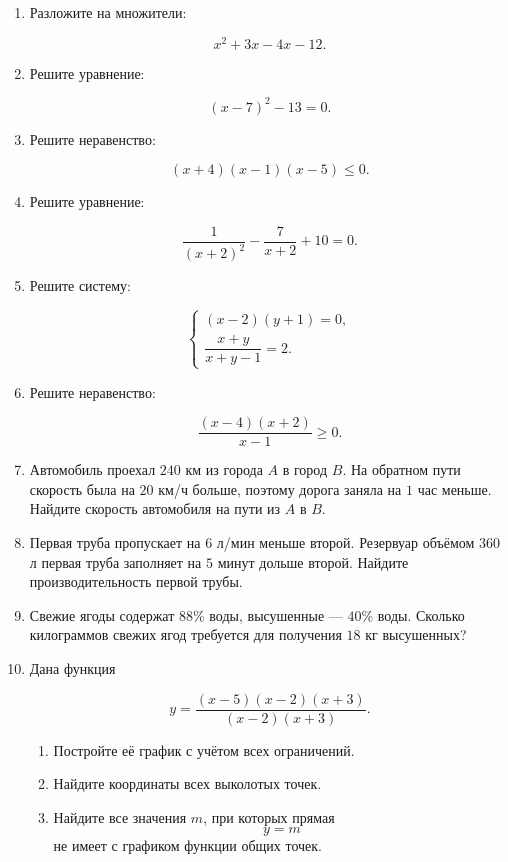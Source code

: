 \documentclass[a4paper,12pt]{article}
\begin{document}
\begin{enumerate}

\item
Разложите на множители:

\[
x^2+3x-4x-12.
\]

\item
Решите уравнение:

\[
(x-7)^2-13=0.
\]

\item
Решите неравенство:

\[
(x+4)(x-1)(x-5)\le0.
\]

\item
Решите уравнение:

\[
\frac{1}{(x+2)^2}
-\frac{7}{x+2}
+10=0.
\]

\item
Решите систему:

\[
\begin{cases}
(x-2)(y+1)=0,\\[0.4em]
\dfrac{x+y}{x+y-1}=2.
\end{cases}
\]

\item
Решите неравенство:

\[
\frac{(x-4)(x+2)}{x-1}\ge0.
\]

\item
Автомобиль проехал \(240\) км из города \(A\) в город \(B\).
На обратном пути скорость была на \(20\) км/ч больше, поэтому дорога заняла на \(1\) час меньше.
Найдите скорость автомобиля на пути из \(A\) в \(B\).

\item
Первая труба пропускает на \(6\) л/мин меньше второй.
Резервуар объёмом \(360\) л первая труба заполняет на \(5\) минут дольше второй.
Найдите производительность первой трубы.

\item
Свежие ягоды содержат \(88\%\) воды, высушенные --- \(40\%\) воды.
Сколько килограммов свежих ягод требуется для получения \(18\) кг высушенных?

\item
Дана функция

\[
y=
\frac{(x-5)(x-2)(x+3)}
     {(x-2)(x+3)}.
\]

\begin{enumerate}[label=\alph*)]
    \item Постройте её график с учётом всех ограничений.
    \item Найдите координаты всех выколотых точек.
    \item Найдите все значения \(m\), при которых прямая
    \[
    y=m
    \]
    не имеет с графиком функции общих точек.
\end{enumerate}

\end{enumerate}
\end{document}
